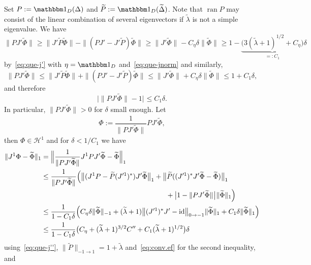 \documentclass[12pt,reqno,a4paper]{amsart}            %
\numberwithin{equation}{section}
\newcommand{\myfont}{\sffamily}
\theoremstyle{mythmstyle}       %
\theoremstyle{mydefstyle}        %
\let\oldendproof\endproof
\renewenvironment{proof}[1][\bfseries\myfont\proofname]{%
  \oldproof[\bfseries \myfont #1]%
}{\oldendproof}
\newcommand{\bigabs}[2][{}]{\bigl\lvert{#2}\bigr\rvert_{#1}}     %
\newcommand{\normsymb}{\|}
\newcommand{\bignormsymb}[1]{#1\|}
\newcommand{\norm}[2][{}]{\normsymb{#2}\normsymb_{{#1}}}    %
\newcommand{\bignorm}[2][{}]{\bignormsymb{\bigl}{#2}\bignormsymb{\bigr}_{#1}}
\newcommand{\Bignorm}[2][{}]{\bignormsymb{\Bigl}{#2}\bignormsymb{\Bigr}_{#1}}
\DeclareMathOperator{\ran}    {ran}
\DeclareMathOperator{\id}     {id}   %
\newcommand{\1}{\mathbbm 1}                    %
\newcommand{\wt}{\widetilde}           %
\newcommand{\HS}{\mathscr H}           %
\begin{document}
\begin{proof}
  Set $P:=\1_D(\Delta)$ and $\wt P:=\1_D(\wt\Delta)$.  Note that $\ran
  P$ may consist of the linear combination of several eigenvectors if
  $\wt \lambda$ is not a simple eigenvalue.  We have
  \begin{equation*}
    \norm{PJ'\wt \Phi}
    \ge \norm{J'\wt P\wt\Phi} - \norm{(PJ'-J'\wt P)\wt\Phi}
    \ge \norm{J'\wt\Phi} - C_\eta \delta \norm {\wt \Phi}
    \ge 1-\underbrace{\bigl(3(\wt \lambda+1)^{1/2}+C_\eta\bigr)}_{=:C_1}\delta
  \end{equation*}
  by~\eqref{eq:que-j'} with $\eta=\1_D$ and~\eqref{eq:que-jnorm} and similarly,
  \begin{equation*}
    \norm{PJ'\wt \Phi}
    \le \norm{J'\wt P\wt\Phi} + \norm{(PJ'-J'\wt P)\wt\Phi}
    \le \norm{J'\wt\Phi} + C_\eta \delta \norm {\wt \Phi}
    \le 1+C_1 \delta,
  \end{equation*}
  and therefore
  \begin{equation}
    \label{eq:conv.ef}
    \bigabs{\norm{PJ'\wt \Phi}-1} \le C_1 \delta.
  \end{equation}
  In
  particular, $\norm{PJ'\wt\Phi} >0$ for $\delta$ small enough.
  Let
  \begin{equation*}
    \Phi := \frac 1 {\norm {PJ'\wt\Phi}} P J' \wt \Phi,
  \end{equation*}
  then $\Phi \in \HS^1$ and for $\delta<1/C_1$ we have
  \begin{align*}
    \norm[1]{J^1 \Phi - \wt \Phi}
    &= 
    \Bignorm[1]{\frac 1 {\norm {PJ'\wt\Phi}} J^1P J' \wt \Phi - \wt \Phi}\\
    &\le\frac 1 {\norm {PJ'\wt\Phi}} 
    \Bigl( 
      \bignorm[1]{(J^1P - \wt P (J^{\prime 1})^*)J'\wt\Phi}
      + \bignorm[1]{\wt P((J^{\prime 1})^*J'\wt \Phi - \wt \Phi)}
      \\
    &\hspace*{0.515\textwidth}+ \bigabs{1-\norm{PJ'\wt \Phi}} \norm[1]{\wt \Phi}
    \Bigr)\\
    &\le\frac 1 {1-C_1\delta} 
    \Bigl( 
      C_\eta \delta \norm[-1]{\wt \Phi}
      + (\wt\lambda+1) \bignorm[0\to-1]{(J^{\prime 1})^*J'-\id} \norm[1]{\wt \Phi}
      + C_1\delta \norm[1]{\wt \Phi}
    \Bigr)\\
    &\le\frac 1 {1-C_1\delta} 
    \bigl(C_\eta + (\wt\lambda+1)^{3/2} C'' + C_1 (\wt \lambda+1)^{1/2}
    \bigr)\delta
  \end{align*}
  using~\eqref{eq:que-j''}, $\norm[-1 \to 1]{\wt P}=1+\wt \lambda$
  and~\eqref{eq:conv.ef} for the second inequality, and

\end{proof}
\end{document}
